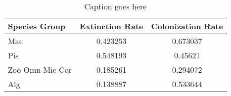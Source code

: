 
\begin{table}
   \centering
   \begin{tabular}{lcc}
Species Group& Extinction Rate& Colonization Rate\\
\hline
{ Mac  }& 0.423253& 0.673037\\
{ Pis  }& 0.548193& 0.45621\\
{ Zoo Omn Mic Cor  }& 0.185261& 0.294072\\
{ Alg  }& 0.138887& 0.533644\\
   \end{tabular}
   \caption{Caption goes here}
   \label{tab:myfirsttable}
\end{table}

